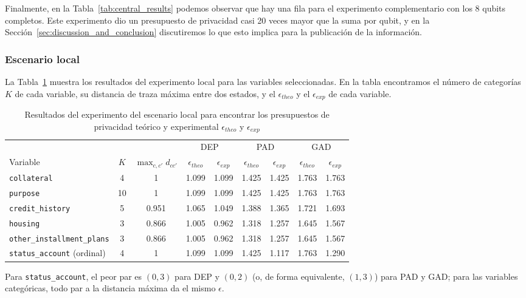 \documentclass{ieeeaccess}
\begin{document}
Finalmente, en la Tabla~\ref{tab:central_results} podemos observar que hay una fila para el experimento complementario con los 8 qubits completos. Este experimento dio un presupuesto de privacidad casi 20 veces mayor que la suma por qubit, y en la Sección~\ref{sec:discussion_and_conclusion} discutiremos lo que esto implica para la publicación de la información.

\subsubsection{Escenario local}

La Tabla~\ref{tab:local_results} muestra los resultados del experimento local para las variables seleccionadas. En la tabla encontramos el número de categorías $K$ de cada variable, su distancia de traza máxima entre dos estados, y el $\epsilon_{theo}$ y el $\epsilon_{exp}$ de cada variable.

\begin{table}[!t]
  \caption{Resultados del experimento del escenario local para encontrar los presupuestos de privacidad teórico y experimental $\epsilon_{theo}$ y $\epsilon_{exp}$}
  \label{tab:local_results}
  \centering
  \begin{tabular}{lcccccccc}
    \toprule
     & & & \multicolumn{2}{c}{DEP} & \multicolumn{2}{c}{PAD} & \multicolumn{2}{c}{GAD} \\
    \cmidrule(lr){4-5} \cmidrule(lr){6-7} \cmidrule(l){8-9}
    Variable & $K$ & $\max_{c,c'} d_{cc'}$ & $\epsilon_{theo}$ & $\epsilon_{exp}$ & $\epsilon_{theo}$ & $\epsilon_{exp}$ & $\epsilon_{theo}$ & $\epsilon_{exp}$ \\
    \midrule
    \texttt{collateral}                        & 4  & 1     & 1.099 & 1.099 & 1.425 & 1.425 & 1.763 & 1.763 \\
    \texttt{purpose}                           & 10 & 1     & 1.099 & 1.099 & 1.425 & 1.425 & 1.763 & 1.763 \\
    \texttt{credit\_history}                   & 5  & 0.951 & 1.065 & 1.049 & 1.388 & 1.365 & 1.721 & 1.693 \\
    \texttt{housing}                           & 3  & 0.866 & 1.005 & 0.962 & 1.318 & 1.257 & 1.645 & 1.567 \\
    \texttt{other\_installment\_plans}         & 3  & 0.866 & 1.005 & 0.962 & 1.318 & 1.257 & 1.645 & 1.567 \\
    \texttt{status\_account} (ordinal)         & 4  & 1     & 1.099 & 1.099 & 1.425 & 1.117 & 1.763 & 1.290 \\
    \bottomrule
  \end{tabular}
  \par\smallskip
  {\footnotesize Para \texttt{status\_account}, el peor par es $(0,3)$ para DEP y $(0,2)$ (o, de forma equivalente, $(1,3)$) para PAD y GAD; para las variables categóricas, todo par a la distancia máxima da el mismo $\epsilon$.\par}
\end{table}
\end{document}
